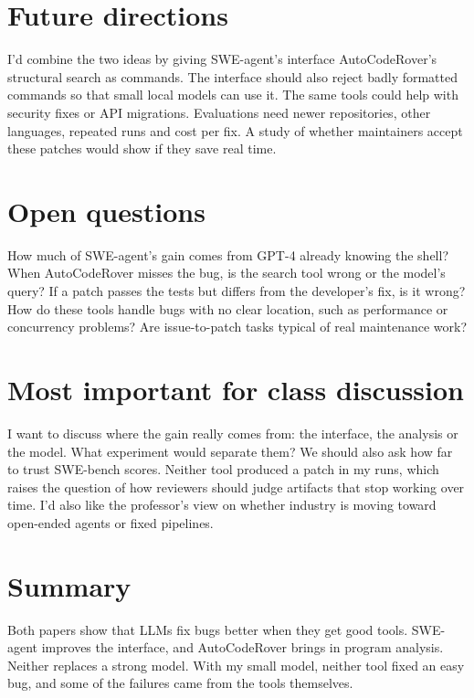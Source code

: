 \documentclass[11pt]{article}
\begin{document}
\section{Future directions}

I'd combine the two ideas by giving SWE-agent's interface AutoCodeRover's structural search as commands. The interface should also reject badly formatted commands so that small local models can use it. The same tools could help with security fixes or API migrations. Evaluations need newer repositories, other languages, repeated runs and cost per fix. A study of whether maintainers accept these patches would show if they save real time.

\section{Open questions}

How much of SWE-agent's gain comes from GPT-4 already knowing the shell? When AutoCodeRover misses the bug, is the search tool wrong or the model's query? If a patch passes the tests but differs from the developer's fix, is it wrong? How do these tools handle bugs with no clear location, such as performance or concurrency problems? Are issue-to-patch tasks typical of real maintenance work?

\section{Most important for class discussion}

I want to discuss where the gain really comes from: the interface, the analysis or the model. What experiment would separate them? We should also ask how far to trust SWE-bench scores. Neither tool produced a patch in my runs, which raises the question of how reviewers should judge artifacts that stop working over time. I'd also like the professor's view on whether industry is moving toward open-ended agents or fixed pipelines.

\section{Summary}

Both papers show that LLMs fix bugs better when they get good tools. SWE-agent improves the interface, and AutoCodeRover brings in program analysis. Neither replaces a strong model. With my small model, neither tool fixed an easy bug, and some of the failures came from the tools themselves.
\end{document}
